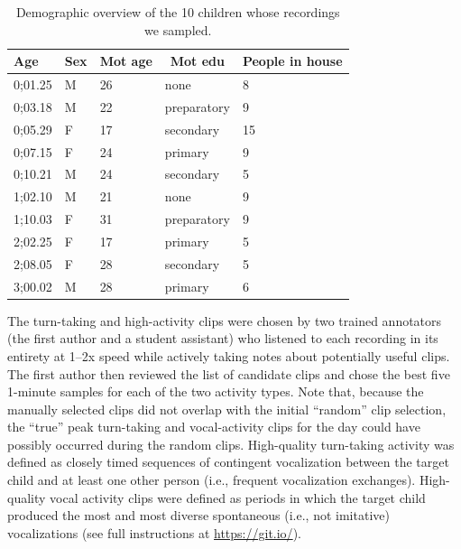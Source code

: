 \documentclass[floatsintext,man]{apa6}
\theoremstyle{definition}
\theoremstyle{definition}
\theoremstyle{definition}
\theoremstyle{remark}
\begin{document}
\begin{table}[tbp]
\begin{center}
\begin{threeparttable}
\caption{\label{tab:tab1}Demographic overview of the 10 children whose recordings we sampled.}
\begin{tabular}{lllll}
\toprule
Age & \multicolumn{1}{c}{Sex} & \multicolumn{1}{c}{Mot age} & \multicolumn{1}{c}{Mot edu} & \multicolumn{1}{c}{People in house}\\
\midrule
0;01.25 & M & 26 & none & 8\\
0;03.18 & M & 22 & preparatory & 9\\
0;05.29 & F & 17 & secondary & 15\\
0;07.15 & F & 24 & primary & 9\\
0;10.21 & M & 24 & secondary & 5\\
1;02.10 & M & 21 & none & 9\\
1;10.03 & F & 31 & preparatory & 9\\
2;02.25 & F & 17 & primary & 5\\
2;08.05 & F & 28 & secondary & 5\\
3;00.02 & M & 28 & primary & 6\\
\bottomrule
\end{tabular}
\end{threeparttable}
\end{center}
\end{table}

The turn-taking and high-activity clips were chosen by two trained
annotators (the first author and a student assistant) who listened to
each recording in its entirety at 1--2x speed while actively taking
notes about potentially useful clips. The first author then reviewed the
list of candidate clips and chose the best five 1-minute samples for
each of the two activity types. Note that, because the manually selected
clips did not overlap with the initial \enquote{random} clip selection,
the \enquote{true} peak turn-taking and vocal-activity clips for the day
could have possibly occurred during the random clips. High-quality
turn-taking activity was defined as closely timed sequences of
contingent vocalization between the target child and at least one other
person (i.e., frequent vocalization exchanges). High-quality vocal
activity clips were defined as periods in which the target child
produced the most and most diverse spontaneous (i.e., not imitative)
vocalizations (see full instructions at \url{https://git.io/}).
\end{document}
